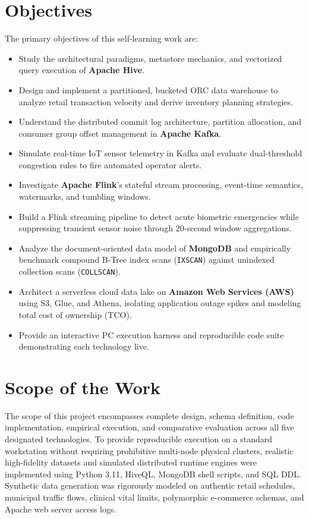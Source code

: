 \documentclass[12pt,a4paper]{report}
\begin{document}
\section{Objectives}
The primary objectives of this self-learning work are:
\begin{itemize}
    \item Study the architectural paradigms, metastore mechanics, and vectorized query execution of \textbf{Apache Hive}.
    \item Design and implement a partitioned, bucketed ORC data warehouse to analyze retail transaction velocity and derive inventory planning strategies.
    \item Understand the distributed commit log architecture, partition allocation, and consumer group offset management in \textbf{Apache Kafka}.
    \item Simulate real-time IoT sensor telemetry in Kafka and evaluate dual-threshold congestion rules to fire automated operator alerts.
    \item Investigate \textbf{Apache Flink}'s stateful stream processing, event-time semantics, watermarks, and tumbling windows.
    \item Build a Flink streaming pipeline to detect acute biometric emergencies while suppressing transient sensor noise through 20-second window aggregations.
    \item Analyze the document-oriented data model of \textbf{MongoDB} and empirically benchmark compound B-Tree index scans (\texttt{IXSCAN}) against unindexed collection scans (\texttt{COLLSCAN}).
    \item Architect a serverless cloud data lake on \textbf{Amazon Web Services (AWS)} using S3, Glue, and Athena, isolating application outage spikes and modeling total cost of ownership (TCO).
    \item Provide an interactive PC execution harness and reproducible code suite demonstrating each technology live.
\end{itemize}

\section{Scope of the Work}
The scope of this project encompasses complete design, schema definition, code implementation, empirical execution, and comparative evaluation across all five designated technologies. To provide reproducible execution on a standard workstation without requiring prohibitive multi-node physical clusters, realistic high-fidelity datasets and simulated distributed runtime engines were implemented using Python 3.11, HiveQL, MongoDB shell scripts, and SQL DDL. Synthetic data generation was rigorously modeled on authentic retail schedules, municipal traffic flows, clinical vital limits, polymorphic e-commerce schemas, and Apache web server access logs.
\end{document}
